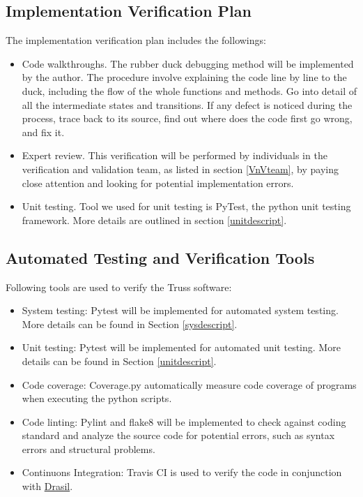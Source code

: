 \documentclass[12pt, titlepage]{article}
\begin{document}
\subsection{Implementation Verification Plan} \label{implplan}
The implementation verification plan includes the followings:
\begin{itemize}
	\item Code walkthroughs. The rubber duck debugging 
	\cite{Rubberduckdebugging} method will be implemented by the author. The 
	procedure involve explaining the code line by line to the duck, including 
	the flow of the whole functions and methods. Go into detail of all the 
	intermediate states and transitions. If any defect is noticed during the 
	process, trace	back to its source, find out where does the code first go 
	wrong, and fix it.  
	\item Expert review. This verification will be performed by individuals in 
	the verification and validation team, as listed in section \ref{VnVteam}, 
	by paying close attention and looking for potential implementation errors. 
	\item Unit testing. Tool we used for unit testing is PyTest, the python 
	unit testing framework. More details are outlined in section 
	\ref{unitdescript}.
\end{itemize}

\subsection{Automated Testing and Verification Tools} \label{autotool}
Following tools are used to verify the Truss software:
\begin{itemize}
	\item System testing: Pytest will be implemented for automated system 
	testing. More details can be found in Section \ref{sysdescript}.
	\item Unit testing: Pytest will be implemented for automated unit testing. 
	More details can be found in Section \ref{unitdescript}.
	\item Code coverage: Coverage.py automatically measure code coverage of 
	programs when executing the python scripts.
	\item Code linting: Pylint and flake8 will be implemented to check against 
	coding standard and analyze the source code for potential errors, such as 
	syntax errors and structural problems.  
	\item Continuons Integration: Travis CI is used to verify the code in 
	conjunction with \href{https://github.com/JacquesCarette/Drasil}{Drasil}.
\end{itemize}
\end{document}
